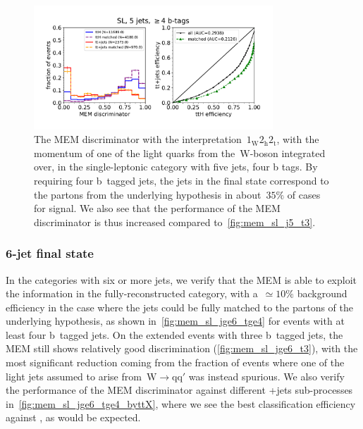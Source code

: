 \begin{figure}[ht]
\begin{centering}
\includegraphics[width = 0.8\textwidth]{figures/mem/mem_sl_j5_tge4.pdf}
\caption[MEM with the~$1_{\mathrm{W}} 2_{\mathrm{h}} 2_{\mathrm{t}}$ interpretation in the 5 jet, $\ge4$ b~tags category]{The MEM discriminator with the interpretation~$1_{\mathrm{W}} 2_{\mathrm{h}} 2_{\mathrm{t}}$, with the momentum of one of the light quarks from the~$\mathrm{W}$-boson integrated over, in the single-leptonic category with five jets, four b tags. By requiring four b~tagged jets, the jets in the final state correspond to the partons from the underlying hypothesis in about~$35\%$ of cases for signal. We also see that the performance of the MEM discriminator is thus increased compared to~\cref{fig:mem_sl_j5_t3}.}
\label{fig:mem_sl_j5_t4}
\end{centering}
\end{figure}

\subsubsection{6-jet final state}
In the categories with six or more jets, we verify that the MEM is able to exploit the information in the fully-reconstructed category, with a~$\simeq 10\%$ background efficiency in the case where the jets could be fully matched to the partons of the underlying hypothesis, as shown in~\cref{fig:mem_sl_jge6_tge4} for events with at least four b~tagged jets. On the extended events with three b~tagged jets, the MEM still shows relatively good discrimination (\cref{fig:mem_sl_jge6_t3}), with the most significant reduction coming from the fraction of events where one of the light jets assumed to arise from~$\mathrm{W} \rightarrow \mathrm{q} \mathrm{q}'$ was instead spurious. We also verify the performance of the MEM discriminator against different \ttbar+jets sub-processes in~\cref{fig:mem_sl_jge6_tge4_byttX}, where we see the best classification efficiency against \ttbb, as would be expected.

